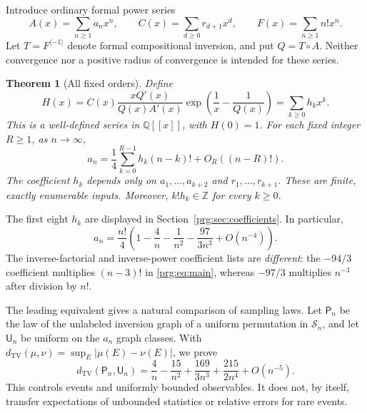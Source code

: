 \documentclass[11pt,letterpaper]{article}
\numberwithin{equation}{section}
\newtheorem{theorem}{Theorem}[section]
\theoremstyle{definition}\newtheorem{definition}[theorem]{Definition}
\theoremstyle{remark}\newtheorem{remark}[theorem]{Remark}
\newcommand{\ZZ}{\mathbb Z}
\newcommand{\QQ}{\mathbb Q}
\DeclareMathOperator{\TV}{TV}
\begin{document}
Introduce ordinary formal power series
\begin{equation}\label{prg:eq:series}
 A(x)=\sum_{n\geq1}a_nx^n,\qquad
 C(x)=\sum_{d\geq0}r_{d+1}x^d,\qquad
 F(x)=\sum_{n\geq1}n!x^n.
\end{equation}
Let $T=F^{\langle-1\rangle}$ denote formal compositional inversion,
and put $Q=T\circ A$. Neither convergence nor a positive radius of
convergence is intended for these series.

\begin{theorem}[All fixed orders]\label{prg:thm:main}
Define
\begin{equation}\label{prg:eq:H}
 H(x)=C(x)\frac{xQ'(x)}{Q(x)A'(x)}
       \exp\left(\frac1x-\frac1{Q(x)}\right)
      =\sum_{k\geq0}h_kx^k.
\end{equation}
This is a well-defined series in $\QQ[[x]]$, with $H(0)=1$.
For each fixed integer $R\geq1$, as $n\longrightarrow\infty$,
\begin{equation}\label{prg:eq:main}
 a_n=\frac14\sum_{k=0}^{R-1}h_k(n-k)!
       +O_R((n-R)!).
\end{equation}
The coefficient $h_k$ depends only on $a_1,\ldots,a_{k+2}$ and
$r_1,\ldots,r_{k+1}$. These are finite, exactly enumerable inputs.
Moreover, $k!h_k\in\ZZ$ for every $k\geq0$.
\end{theorem}

The first eight $h_k$ are displayed in Section~\ref{prg:sec:coefficients}.
In particular,
\begin{equation}\label{prg:eq:three}
 a_n=\frac{n!}{4}\left(1-\frac4n-\frac1{n^2}
                           -\frac{97}{3n^3}+O(n^{-4})\right).
\end{equation}
The inverse-factorial and inverse-power coefficient lists are
\emph{different}: the $-94/3$ coefficient multiplies $(n-3)!$ in
\eqref{prg:eq:main}, whereas $-97/3$ multiplies $n^{-3}$ after division
by $n!$.

The leading equivalent gives a natural comparison of sampling laws.
Let $\mathsf P_n$ be the law of the unlabeled inversion graph of a
uniform permutation in $\mathcal S_n$, and let $\mathsf U_n$ be
uniform on the $a_n$ graph classes. With
$d_{\TV}(\mu,\nu)=\sup_E|\mu(E)-\nu(E)|$, we prove
\begin{equation}\label{prg:eq:tvintro}
 d_{\TV}(\mathsf P_n,\mathsf U_n)=\frac4n-\frac{15}{n^2}
 +\frac{169}{3n^3}+\frac{215}{2n^4}+O(n^{-5}).
\end{equation}
This controls events and uniformly bounded observables. It does not,
by itself, transfer expectations of unbounded statistics or relative
errors for rare events.
\end{document}
